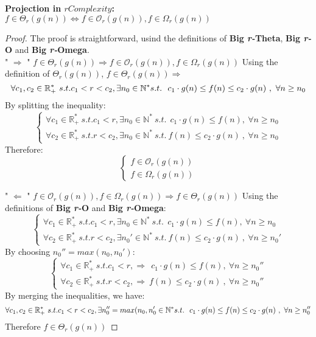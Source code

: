 \begin{theorem}
    \textbf{Projection in $rComplexity$:}  \\  $ f \in \Theta_{r}(g(n)) \Leftrightarrow f \in \mathcal{O}_{r}(g(n)), f \in \Omega_{r}(g(n)) $
\end{theorem}
\begin{proof}
    The proof is straightforward, usind the definitions of \textbf{Big \textit{r-}Theta}, \textbf{Big \textit{r-}O} and \textbf{Big \textit{r-}Omega}. \\
    " $\Rightarrow$ " $ f \in \Theta_{r}(g(n)) \Rightarrow f \in \mathcal{O}_{r}(g(n)), f \in \Omega_{r}(g(n)) $
    Using the definition of $\Theta_{r}(g(n))$, $ f \in \Theta_{r}(g(n)) \Rightarrow$
    \[\forall c_{1}, c_{2} \in \mathbb{R}^{*}_{+} \ s.t. c_{1} < r < c_{2} , \exists n_{0} \in \mathbb{N}^{*}\ \\ s.t.\ \ c_{1} \cdot g(n) \leq f(n) \leq c_{2} \cdot g(n)\ ,\  \forall n \geq n_{0} \]
    By splitting the inequality:
    \[\begin{cases}
          \forall c_{1} \in \mathbb{R}^{*}_{+} \ s.t. c_{1} < r , \exists n_{0} \in \mathbb{N}^{*}\ s.t.\ \ c_{1} \cdot g(n) \leq f(n) ,\  \forall n \geq n_{0} \\ \forall  c_{2} \in \mathbb{R}^{*}_{+} \ s.t. r < c_{2} , \exists n_{0} \in \mathbb{N}^{*}\ s.t.\ f(n) \leq c_{2} \cdot g(n)\ ,\  \forall n \geq n_{0}
    \end{cases}\]
    Therefore:
    \[\begin{cases}
          f \in \mathcal{O}_{r}(g(n)) \\ f \in \Omega_{r}(g(n))
    \end{cases}\]

    " $\Leftarrow$ " $ f \in \mathcal{O}_{r}(g(n)), f \in \Omega_{r}(g(n)) \Rightarrow f \in \Theta_{r}(g(n)) $
    Using the definitions of \textbf{Big \textit{r-}O} and \textbf{Big \textit{r-}Omega}:
    \[\begin{cases}
          \forall c_{1} \in \mathbb{R}^{*}_{+} \ s.t. c_{1} < r , \exists n_{0} \in \mathbb{N}^{*}\ s.t.\ \ c_{1} \cdot g(n) \leq f(n) ,\  \forall n \geq n_{0} \\ \forall  c_{2} \in \mathbb{R}^{*}_{+} \ s.t. r < c_{2} , \exists n_{0}' \in \mathbb{N}^{*}\ s.t.\ f(n) \leq c_{2} \cdot g(n)\ ,\  \forall n \geq n_{0}'
    \end{cases}\]
    By choosing $n_{0}'' = max(n_{0}, n_{0}')$:
    \[\begin{cases}
          \forall c_{1} \in \mathbb{R}^{*}_{+} \ s.t. c_{1} < r ,\Rightarrow\ \ c_{1} \cdot g(n) \leq f(n) ,\  \forall n \geq n_{0}'' \\ \forall  c_{2} \in \mathbb{R}^{*}_{+} \ s.t. r < c_{2} , \Rightarrow \ f(n) \leq c_{2} \cdot g(n)\ ,\  \forall n \geq n_{0}''
    \end{cases}\]
    By merging the inequalities, we have:
    \[\forall c_{1}, c_{2} \in \mathbb{R}^{*}_{+} \ s.t. c_{1} < r < c_{2} , \exists n_{0}'' = max(n_{0}, n_{0}' \in \mathbb{N}^{*}\ \\ s.t.\ \ c_{1} \cdot g(n) \leq f(n) \leq c_{2} \cdot g(n)\ ,\  \forall n \geq n_{0}'' \]
    Therefore $f \in \Theta_{r}(g(n))$
\end{proof}


